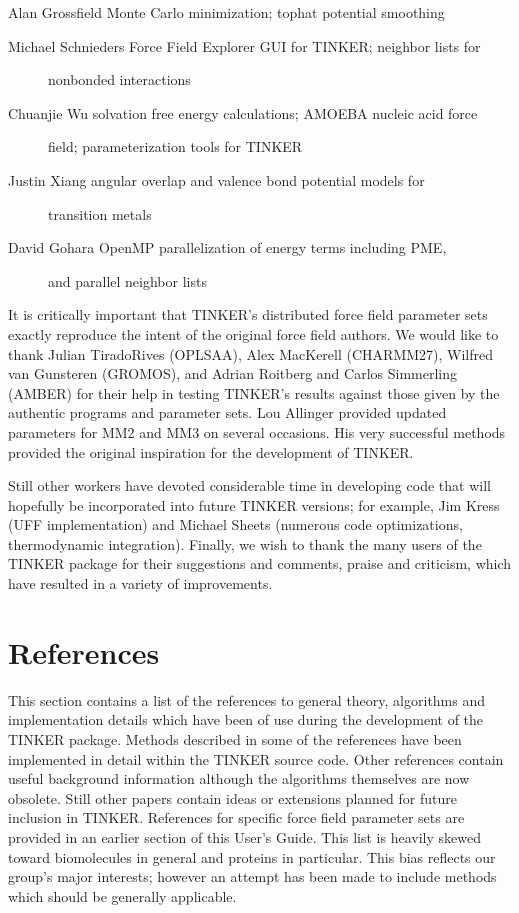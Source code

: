 \documentclass[letterpaper,11pt,english]{sphinxmanual}
\begin{document}
Alan Grossfield Monte Carlo minimization; tophat potential smoothing
\begin{description}
\item[{Michael Schnieders      Force Field Explorer GUI for TINKER; neighbor lists for}] \leavevmode
nonbonded interactions

\item[{Chuanjie Wu     solvation free energy calculations; AMOEBA nucleic acid force}] \leavevmode
field; parameterization tools for TINKER

\item[{Justin Xiang    angular overlap and valence bond potential models for}] \leavevmode
transition metals

\item[{David Gohara    OpenMP parallelization of energy terms including PME,}] \leavevmode
and parallel neighbor lists

\end{description}

It is critically important that TINKER’s distributed force field parameter sets exactly reproduce the intent of the original force field authors. We would like to thank Julian Tirado\sphinxhyphen{}Rives (OPLS\sphinxhyphen{}AA), Alex MacKerell (CHARMM27), Wilfred van Gunsteren (GROMOS), and Adrian Roitberg and Carlos Simmerling (AMBER) for their help in testing TINKER’s results against those given by the authentic programs and parameter sets. Lou Allinger provided updated parameters for MM2 and MM3 on several occasions. His very successful methods provided the original inspiration for the development of TINKER.

Still other workers have devoted considerable time in developing code that will hopefully be incorporated into future TINKER versions; for example, Jim Kress (UFF implementation) and Michael Sheets (numerous code optimizations, thermodynamic integration). Finally, we wish to thank the many users of the TINKER package for their suggestions and comments, praise and criticism, which have resulted in a variety of improvements.


\chapter{References}
\label{\detokenize{text/references:references}}\label{\detokenize{text/references::doc}}
This section contains a list of the references to general theory, algorithms and implementation details which have been of use during the development of the TINKER package. Methods described in some of the references have been implemented in detail within the TINKER source code. Other references contain useful background information although the algorithms themselves are now obsolete. Still other papers contain ideas or extensions planned for future inclusion in TINKER. References for specific force field parameter sets are provided in an earlier section of this User’s Guide. This list is heavily skewed toward biomolecules in general and proteins in particular. This bias reflects our group’s major interests; however an attempt has been made to include methods which should be generally applicable.
\end{document}
